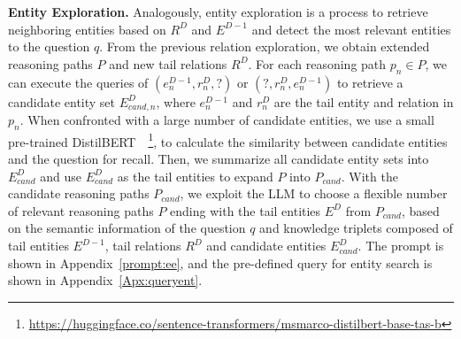 \documentclass{article}
\begin{document}
\textbf{Entity Exploration.} Analogously, entity exploration is a process to retrieve neighboring entities based on $R^{D}$ and $E^{D-1}$ and detect the most relevant entities to the question $q$. From the previous relation exploration, we obtain extended reasoning paths $P$ and new tail relations $R^D$. For each reasoning path $p_n \in P$, we can execute the queries of $(e_n^{D-1}, r_n^D, ?)$ or $(?, r_n^D, e_n^{D-1})$ to retrieve a candidate entity set $E^{D}_{cand,n}$, where $e_n^{D-1}$ and $r_n^D$ are the tail entity and relation in $p_n$.
When confronted with a large number of candidate entities, we use a small pre-trained DistilBERT~\cite{sanh2019distilbert}~\footnote{\url{https://huggingface.co/sentence-transformers/msmarco-distilbert-base-tas-b}}, to calculate the similarity between candidate entities and the question for recall.
Then, we summarize all candidate entity sets into $E^{D}_{cand}$ and use $E^{D}_{cand}$ as the tail entities to expand $P$ into $P_{cand}$.
With the candidate reasoning paths $P_{cand}$, we exploit the LLM to choose a flexible number of relevant reasoning paths $P$ ending with the tail entities $E^{D}$ from $P_{cand}$, based on the semantic information of the question $q$ and knowledge triplets composed of tail entities $E^{D-1}$, tail relations $R^D$ and candidate entities $E^{D}_{cand}$. The prompt is shown in Appendix~\ref{prompt:ee}, and the pre-defined query for entity search is shown in Appendix~\ref{Apx:queryent}.





\vspace{-2mm}
\end{document}
